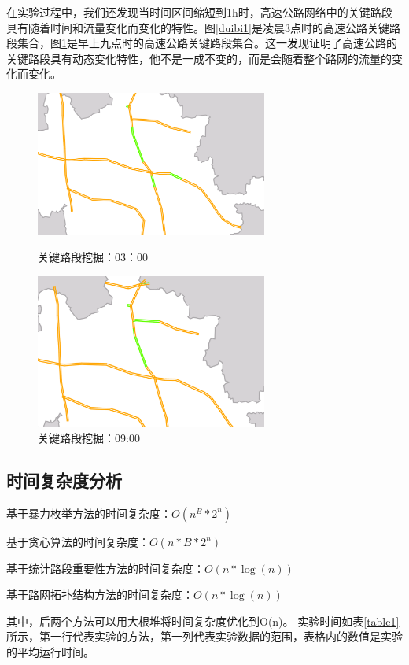 				在实验过程中，我们还发现当时间区间缩短到1h时，高速公路网络中的关键路段具有随着时间和流量变化而变化的特性。图\ref{duibi1}是凌晨3点时的高速公路关键路段集合，图\ref{duibi2}是早上九点时的高速公路关键路段集合。这一发现证明了高速公路的关键路段具有动态变化特性，他不是一成不变的，而是会随着整个路网的流量的变化而变化。


				\begin{figure}[h]
				\begin{minipage}{0.5\linewidth}
					\centering
					\includegraphics[width=3.0in]{picture/duibi1}
					\caption{关键路段挖掘：03：00}
					\label{duibi1}
				\end{minipage}%
				\begin{minipage}{0.5\linewidth}
					\centering
					\includegraphics[width=3.0in]{picture/duibi2}
					\caption{关键路段挖掘：09:00}
					\label{duibi2}
				\end{minipage}
				\end{figure}

			\subsection{时间复杂度分析}
				基于暴力枚举方法的时间复杂度：$O({n^B}*{2^n})$

				基于贪心算法的时间复杂度：$O(n*B*{2^n})$

				基于统计路段重要性方法的时间复杂度：$O(n*\log (n))$

				基于路网拓扑结构方法的时间复杂度：$O(n*\log (n))$

				其中，后两个方法可以用大根堆将时间复杂度优化到O(n)。
				实验时间如表\ref{table1}所示，第一行代表实验的方法，第一列代表实验数据的范围，表格内的数值是实验的平均运行时间。


